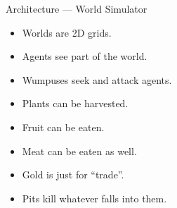 \documentclass{beamer}
\begin{document}
\begin{frame}{Architecture --- World Simulator}
\begin{center}
      \end{center}
%
      \begin{itemize}
         \setlength\itemsep{-1.25em}
         \item<1>Worlds are 2D grids.%
         \item<2>Agents see part of the world.%
         \item<3>Wumpuses seek and attack agents.%
         \item<4>Plants can be harvested.%
         \item<5>Fruit can be eaten.%
         \item<6>Meat can be eaten as well.%
         \item<7>Gold is just for ``trade''.%
         \item<8> Pits kill whatever falls into them.%
      \end{itemize}
   \end{frame}
   
\end{document}
